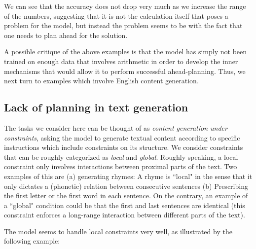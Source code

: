 We can see that the accuracy does not drop very much as we increase the range of the numbers, suggesting that it is not the calculation itself that poses a problem for the model, but instead the problem seems to be with the fact that one needs to plan ahead for the solution.

A possible critique of the above examples is that the model has simply not been trained on enough data that involves arithmetic in order to develop the inner mechanisms that would allow it to perform successful ahead-planning. Thus, we next turn to examples which involve English content generation.

\subsection{Lack of planning in text generation}
The tasks we consider here can be thought of as \emph{content generation under constraints}, asking the model to generate textual content according to specific instructions which include constraints on its structure. We consider constraints that can be roughly categorized as \emph{local} and \emph{global}. Roughly speaking, a local constraint only involves interactions between proximal parts of the text. Two examples of this are (a) generating rhymes: A rhyme is ``local" in the sense that it only dictates a (phonetic) relation between consecutive sentences (b) Prescribing the first letter or the first word in each sentence. On the contrary, an example of a ``global" condition could be that the first and last sentences are identical (this constraint enforces a long-range interaction between different parts of the text).

The model seems to handle local constraints very well, as illustrated by the following example: 

